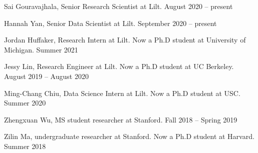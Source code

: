 
Sai Gouravajhala, Senior Research Scientist at Lilt. \hfill August 2020 -- present

Hannah Yan, Senior Data Scientist at Lilt. \hfill September 2020 -- present

Jordan Huffaker, Research Intern at Lilt. Now a Ph.D student at University of Michigan. \hfill Summer 2021

Jessy Lin, Research Engineer at Lilt. Now a Ph.D student at UC Berkeley. \hfill August 2019 -- August 2020

Ming-Chang Chiu, Data Science Intern at Lilt. Now a Ph.D student at USC. \hfill Summer 2020

Zhengxuan Wu, MS student researcher at Stanford. \hfill Fall 2018 -- Spring 2019

Zilin Ma, undergraduate researcher at Stanford. Now a Ph.D student at Harvard. \hfill Summer 2018\\



